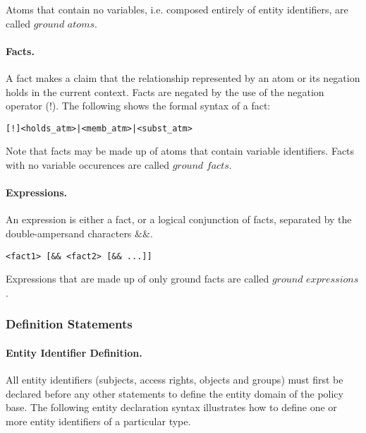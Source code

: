 \documentclass[10pt, twocolumn]{article}
\begin{document}
          Atoms that contain no variables, i.e. composed entirely of entity
          identifiers, are called $ground$ $atoms$.

        \paragraph{Facts.}
          A fact makes a claim that the relationship represented by an atom or
          its negation holds in the current context. Facts are negated by the
          use of the negation operator ($!$). The following shows the formal
          syntax of a fact:
 
          \begin{verbatim}[!]<holds_atm>|<memb_atm>|<subst_atm>\end{verbatim}

          Note that facts may be made up of atoms that contain variable
          identifiers. Facts with no variable occurences are called $ground$
          $facts$.
 
        \paragraph{Expressions.}
          An expression is either a fact, or a logical conjunction of facts,
          separated by the double-ampersand characters $\&\&$.

          \begin{verbatim}<fact1> [&& <fact2> [&& ...]]\end{verbatim}

          Expressions that are made up of only ground facts are called $ground$
          $expressions$.

      \subsubsection{Definition Statements}

        \paragraph{Entity Identifier Definition.}

          All entity identifiers (subjects, access rights, objects and groups)
          must first be declared before any other statements to define the
          entity domain of the policy base. The following entity declaration
          syntax illustrates how to define one or more entity identifiers of a
          particular type.
\end{document}
